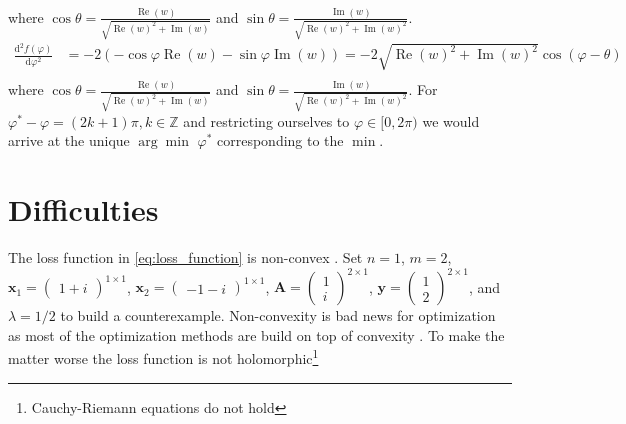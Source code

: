 \begin{Proof}
\begin{equation}
\begin{split}
				\end{split}
			  \end{equation}
			  where $\cos\theta = \frac{\operatorname{Re}(w)}{\sqrt{\operatorname{Re}(w)^2+\operatorname{Im}(w)}}$ and $\sin\theta = \frac{\operatorname{Im}(w)}{\sqrt{\operatorname{Re}(w)^2+\operatorname{Im}(w)^2}}$.
			  \begin{equation}
				\begin{split}
				\frac{\mathrm{d}^2f(\varphi)}{\mathrm{d}\varphi^2} &= - 2\left(-\cos\varphi\operatorname{Re}(w)-\sin\varphi\operatorname{Im}(w)\right) = -2\sqrt{\operatorname{Re}(w)^2+\operatorname{Im}(w)^2}\cos(\varphi-\theta)\\ 
				\end{split}
			  \end{equation}
			  where $\cos\theta = \frac{\operatorname{Re}(w)}{\sqrt{\operatorname{Re}(w)^2+\operatorname{Im}(w)}}$ and $\sin\theta = \frac{\operatorname{Im}(w)}{\sqrt{\operatorname{Re}(w)^2+\operatorname{Im}(w)^2}}$. 
			  For $\varphi^\ast-\varphi = (2k+1)\pi, k \in \mathbb{Z}$ and restricting ourselves to $\varphi \in [0,2\pi)$ we would arrive at the unique $\arg\min$ $\varphi^*$ corresponding to the $\min$.
		\end{Proof}


  
\section{Difficulties}

The loss function in \cref{eq:loss_function} is non-convex \cite{Candes2014}. Set $n=1$, $m=2$, $\boldsymbol{x}_1 = \begin{pmatrix}1+i\end{pmatrix}^{1 \times 1}$, 
$\boldsymbol{x}_2 = \begin{pmatrix}-1-i\end{pmatrix}^{1 \times 1}$, $\boldsymbol{A}=\begin{pmatrix}1\\i \end{pmatrix}^{2 \times 1}$, 
$\boldsymbol{y}=\begin{pmatrix}1\\2 \end{pmatrix}^{2 \times 1}$, and $\lambda=1/2$ to build a counterexample. Non-convexity is bad news for 
optimization as most of the optimization methods are build on top of convexity \cite{Boyd2004}\cite{Nocedal2006}. To make the matter worse the loss function is not 
holomorphic\footnote{Cauchy-Riemann equations\cite{Rudin1987} do not hold}

